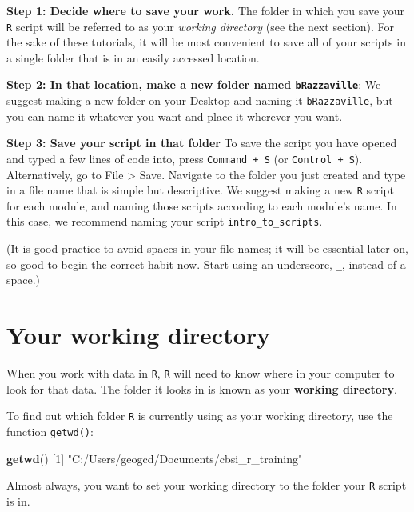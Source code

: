 \documentclass[
]{book}
\newenvironment{Shaded}{\begin{snugshade}}{\end{snugshade}}
\newcommand{\DecValTok}[1]{\textcolor[rgb]{0.00,0.00,0.81}{#1}}
\newcommand{\FunctionTok}[1]{\textcolor[rgb]{0.13,0.29,0.53}{\textbf{#1}}}
\newcommand{\NormalTok}[1]{#1}
\newcommand{\StringTok}[1]{\textcolor[rgb]{0.31,0.60,0.02}{#1}}
\begin{document}
\textbf{Step 1: Decide where to save your work.} The folder in which you save your \texttt{R} script will be referred to as your \emph{working directory} (see the next section). For the sake of these tutorials, it will be most convenient to save all of your scripts in a single folder that is in an easily accessed location.

\textbf{Step 2: In that location, make a new folder named \texttt{bRazzaville}}: We suggest making a new folder on your Desktop and naming it \texttt{bRazzaville}, but you can name it whatever you want and place it wherever you want.

\textbf{Step 3: Save your script in that folder} To save the script you have opened and typed a few lines of code into, press \texttt{Command\ +\ S} (or \texttt{Control\ +\ S}). Alternatively, go to File \textgreater{} Save. Navigate to the folder you just created and type in a file name that is simple but descriptive. We suggest making a new \texttt{R} script for each module, and naming those scripts according to each module's name. In this case, we recommend naming your script \texttt{intro\_to\_scripts}.

(It is good practice to avoid spaces in your file names; it will be essential later on, so good to begin the correct habit now. Start using an underscore, \texttt{\_}, instead of a space.)

\section*{Your working directory}\label{wd}

When you work with data in \texttt{R}, \texttt{R} will need to know where in your computer to look for that data. The folder it looks in is known as your \textbf{working directory}.

To find out which folder \texttt{R} is currently using as your working directory, use the function \texttt{getwd()}:

\begin{Shaded}
\begin{Highlighting}[]
\FunctionTok{getwd}\NormalTok{()}
\NormalTok{[}\DecValTok{1}\NormalTok{] }\StringTok{"C:/Users/geogcd/Documents/cbsi\_r\_training"}
\end{Highlighting}
\end{Shaded}

Almost always, you want to set your working directory to the folder your \texttt{R} script is in.
\end{document}
